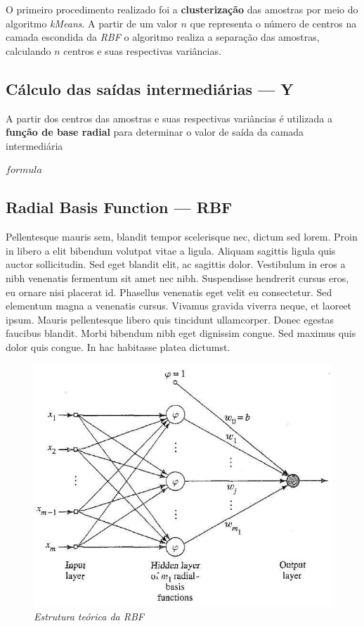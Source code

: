 \documentclass[10pt,twocolumn,letterpaper]{article}
\begin{document}
O primeiro procedimento realizado foi a \textbf{clusterização} das amostras por meio do algoritmo \textit{kMeans}. A partir de um valor $n$ que representa o número de centros na camada escondida da \textit{RBF} o algoritmo realiza a separação das amostras, calculando $n$ centros e suas respectivas variâncias.

\subsection{Cálculo das saídas intermediárias --- Y}

A partir dos centros das amostras e suas respectivas variâncias é utilizada a \textbf{função de base radial} para determinar o valor de saída da camada intermediária

$formula$

\subsection{Radial Basis Function --- RBF}
Pellentesque mauris sem, blandit tempor scelerisque nec, dictum sed lorem. Proin in libero a elit bibendum volutpat vitae a ligula. Aliquam sagittis ligula quis auctor sollicitudin. Sed eget blandit elit, ac sagittis dolor. Vestibulum in eros a nibh venenatis fermentum sit amet nec nibh. Suspendisse hendrerit cursus eros, eu ornare nisi placerat id. Phasellus venenatis eget velit eu consectetur. Sed elementum magna a venenatis cursus. Vivamus gravida viverra neque, et laoreet ipsum. Mauris pellentesque libero quis tincidunt ullamcorper. Donec egestas faucibus blandit. Morbi bibendum nibh eget dignissim congue. Sed maximus quis dolor quis congue. In hac habitasse platea dictumst.
\begin{figure}[h]
\begin{center}
\includegraphics[scale=0.3]{foto1.jpg}
\caption{\textit{Estrutura teórica da RBF}}
\end{center}
\end{figure}
\end{document}
